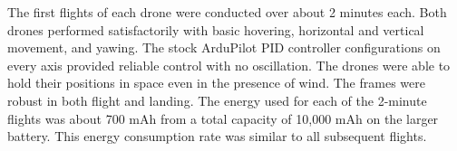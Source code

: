 
The first flights of each drone were conducted over about 2 minutes each. Both drones performed satisfactorily with basic hovering, horizontal and vertical movement, and yawing. The stock ArduPilot PID controller configurations on every axis provided reliable control with no oscillation. The drones were able to hold their positions in space even in the presence of wind. The frames were robust in both flight and landing. The energy used for each of the 2-minute flights was about 700 mAh from a total capacity of 10,000 mAh on the larger battery. This energy consumption rate was similar to all subsequent flights.